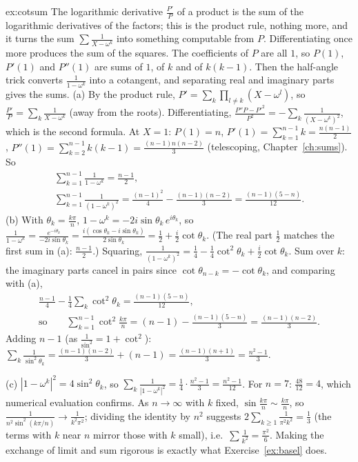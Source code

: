\begin{solution}{ex:cotsum}
\idea The logarithmic derivative $\frac{P'}P$ of a product is the sum of the logarithmic derivatives of the factors; this is the product rule, nothing more, and it turns the sum $\sum\frac1{X-\omega^k}$ into something computable from $P$. Differentiating once more produces the sum of the squares. The coefficients of $P$ are all $1$, so $P(1)$, $P'(1)$ and $P''(1)$ are sums of $1$, of $k$ and of $k(k-1)$. Then the half-angle trick converts $\frac1{1-\omega^k}$ into a cotangent, and separating real and imaginary parts gives the sums.
\writeup (a) By the product rule, $P'=\sum_k\prod_{l\ne k}(X-\omega^l)$, so $\frac{P'}P=\sum_k\frac1{X-\omega^k}$ (away from the roots). Differentiating, $\frac{P''P-P'^2}{P^2}=-\sum_k\frac1{(X-\omega^k)^2}$, which is the second formula. At $X=1$: $P(1)=n$, $P'(1)=\sum_{k=1}^{n-1}k=\frac{n(n-1)}2$, $P''(1)=\sum_{k=2}^{n-1}k(k-1)=\frac{(n-1)n(n-2)}3$ (telescoping, Chapter~\ref{ch:sums}). So
\[
\begin{gathered}\sum_{k=1}^{n-1}\frac1{1-\omega^k}=\frac{n-1}2,\\ \sum_{k=1}^{n-1}\frac1{(1-\omega^k)^2}=\frac{(n-1)^2}4-\frac{(n-1)(n-2)}3=\frac{(n-1)(5-n)}{12}.\end{gathered}
\]
(b) With $\theta_k=\frac{k\pi}n$, $1-\omega^k=-2i\sin\theta_k\,e^{i\theta_k}$, so $\frac1{1-\omega^k}=\frac{e^{-i\theta_k}}{-2i\sin\theta_k}=\frac{i(\cos\theta_k-i\sin\theta_k)}{2\sin\theta_k}=\frac12+\frac i2\cot\theta_k$. (The real part $\frac12$ matches the first sum in (a): $\frac{n-1}2$.) Squaring, $\frac1{(1-\omega^k)^2}=\frac14-\frac14\cot^2\theta_k+\frac i2\cot\theta_k$. Sum over $k$: the imaginary parts cancel in pairs since $\cot\theta_{n-k}=-\cot\theta_k$, and comparing with (a),
\[
\begin{gathered}\frac{n-1}4-\frac14\sum_k\cot^2\theta_k=\frac{(n-1)(5-n)}{12},\\ \text{so}\qquad\sum_{k=1}^{n-1}\cot^2\frac{k\pi}n=(n-1)-\frac{(n-1)(5-n)}3=\frac{(n-1)(n-2)}3.\end{gathered}
\]
Adding $n-1$ (as $\frac1{\sin^2}=1+\cot^2$): $\sum_k\frac1{\sin^2\theta_k}=\frac{(n-1)(n-2)}3+(n-1)=\frac{(n-1)(n+1)}3=\frac{n^2-1}3$.

(c) $|1-\omega^k|^2=4\sin^2\theta_k$, so $\sum_k\frac1{|1-\omega^k|^2}=\frac14\cdot\frac{n^2-1}3=\frac{n^2-1}{12}$. For $n=7$: $\frac{48}{12}=4$, which numerical evaluation confirms. As $n\to\infty$ with $k$ fixed, $\sin\frac{k\pi}n\sim\frac{k\pi}n$, so $\frac1{n^2\sin^2(k\pi/n)}\to\frac1{k^2\pi^2}$; dividing the identity by $n^2$ suggests $2\sum_{k\ge1}\frac1{\pi^2k^2}=\frac13$ (the terms with $k$ near $n$ mirror those with $k$ small), i.e.\ $\sum\frac1{k^2}=\frac{\pi^2}6$. Making the exchange of limit and sum rigorous is exactly what Exercise~\ref{ex:basel} does.
\end{solution}

